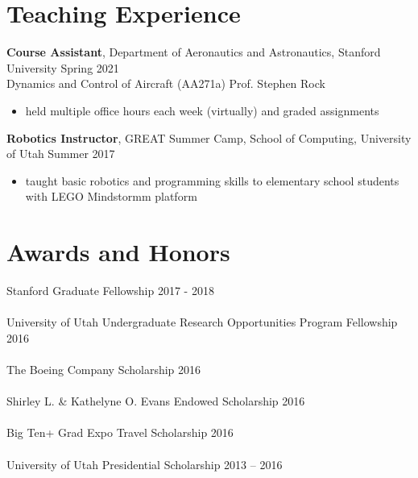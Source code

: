 \documentclass[10pt]{article}
\begin{document}
\section*{Teaching Experience}
\textbf{Course Assistant}, Department of Aeronautics and Astronautics, Stanford University \hfill Spring 2021\\
{\color{lightgray} Dynamics and Control of Aircraft (AA271a) \hfill Prof. Stephen Rock} 
\begin{itemize}
    \item {\color{lightgray} held multiple office hours each week (virtually) and graded assignments}
\end{itemize}
\textbf{Robotics Instructor}, GREAT Summer Camp, School of Computing, University of Utah \hfill Summer 2017
\begin{itemize}
    \item {\color{lightgray} taught basic robotics and programming skills to elementary school students with LEGO Mindstormm platform}
\end{itemize}

\section*{Awards and Honors}
Stanford Graduate Fellowship \hfill  2017 - 2018
\\
\\
University of Utah Undergraduate Research Opportunities Program Fellowship \hfill 2016
\\
\\
The Boeing Company Scholarship \hfill 2016
\\
\\
Shirley L. \& Kathelyne O. Evans Endowed Scholarship \hfill 2016
\\
\\
Big Ten+ Grad Expo Travel Scholarship \hfill 2016
\\
\\
University of Utah Presidential Scholarship \hfill 2013 – 2016
\end{document}
